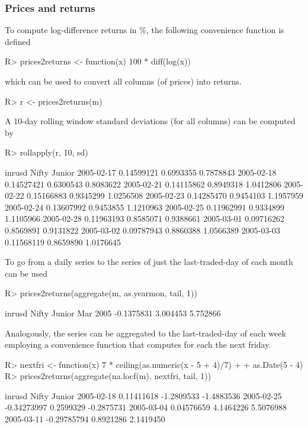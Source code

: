 \documentclass{Z}
\newcommand{\mysection}[1]{\subsubsection[#1]{\textbf{#1}}}
\begin{document}
\mysection{Prices and returns}

To compute log-difference returns in \%, the following
convenience function is defined
\begin{Schunk}
\begin{Sinput}
R> prices2returns <- function(x) 100 * diff(log(x))
\end{Sinput}
\end{Schunk}
which can be used to convert all columns (of prices) into returns.
\begin{Schunk}
\begin{Sinput}
R> r <- prices2returns(m)
\end{Sinput}
\end{Schunk}

A 10-day rolling window standard deviations (for all columns) can
be computed by
\begin{Schunk}
\begin{Sinput}
R> rollapply(r, 10, sd)
\end{Sinput}
\begin{Soutput}
               inrusd     Nifty    Junior
2005-02-17 0.14599121 0.6993355 0.7878843
2005-02-18 0.14527421 0.6300543 0.8083622
2005-02-21 0.14115862 0.8949318 1.0412806
2005-02-22 0.15166883 0.9345299 1.0256508
2005-02-23 0.14285470 0.9454103 1.1957959
2005-02-24 0.13607992 0.9453855 1.1210963
2005-02-25 0.11962991 0.9334899 1.1105966
2005-02-28 0.11963193 0.8585071 0.9388661
2005-03-01 0.09716262 0.8569891 0.9131822
2005-03-02 0.09787943 0.8860388 1.0566389
2005-03-03 0.11568119 0.8659890 1.0176645
\end{Soutput}
\end{Schunk}

To go from a daily series to the series of just the last-traded-day of each month
 can be used
\begin{Schunk}
\begin{Sinput}
R> prices2returns(aggregate(m, as.yearmon, tail, 1))
\end{Sinput}
\begin{Soutput}
             inrusd    Nifty   Junior
Mar 2005 -0.1375831 3.004453 5.752866
\end{Soutput}
\end{Schunk}

Analogously, the series can be aggregated to the last-traded-day of each week
employing a convenience function  that computes for each 
the next friday.
\begin{Schunk}
\begin{Sinput}
R> nextfri <- function(x) 7 * ceiling(as.numeric(x - 5 + 4)/7) + 
+     as.Date(5 - 4)
R> prices2returns(aggregate(na.locf(m), nextfri, tail, 1))
\end{Sinput}
\begin{Soutput}
                inrusd      Nifty     Junior
2005-02-18  0.11411618 -1.2809533 -1.4883536
2005-02-25 -0.34273997  0.2599329 -0.2875731
2005-03-04  0.04576659  4.1464226  5.5076988
2005-03-11 -0.29785794  0.8921286  2.1419450
\end{Soutput}
\end{Schunk}
\end{document}
